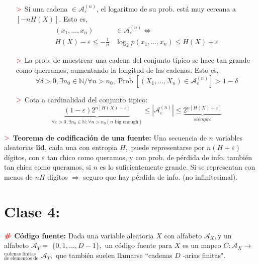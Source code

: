 \documentclass[%
 reprint,
 amsmath,amssymb,
 aps,
]{revtex4-1}
\begin{document}
\begin{enumerate}
  \item[$\textcolor{red}{\mathbf{>}}$] Si una cadena $\in\mathcal{A}_{\varepsilon}^{(n)}$, el logaritmo de su prob. está muy cercana a $[-n H(X)]$. Esto es, 
  $$
  \begin{aligned}
    \left(x_{1}, \ldots, x_{n}\right) & \in \mathcal{A}_{\varepsilon}^{(n)} \Leftrightarrow\\
    H(X)-\varepsilon \leq-\frac{1}{n} & \log _{2} p\left(x_{1}, \ldots, x_{n}\right) \leq H(X)+\varepsilon
  \end{aligned}$$
  
  \item[$\textcolor{red}{\mathbf{>}}$] La prob. de muestrear una cadena del conjunto típico se hace tan grande como querramos,
  aumentando la longitud de las cadenas. Esto es,
  $$
  \forall \delta>0, \exists n_{0} \in \mathbb{N} / \forall n>n_{0}, \operatorname{Prob}\left[\left(X_{1}, \ldots, X_{n}\right) \in \mathcal{A}_{e}^{(n)}\right]>1-\delta
  $$
  \item[$\textcolor{red}{\mathbf{>}}$] Cota a cardinalidad del conjunto tipico:
  $$
  \underbrace{(1-\varepsilon) 2^{n[H(X)-\varepsilon]}}_{\forall \varepsilon>0, \exists n_{0} \in \mathbb{N} : \forall n>n_{0}(n \text{ big enough})}
  \leq
  \left|\mathcal{A}_{\varepsilon}^{(n)}\right| 
  \leq 
  \underbrace{2^{n[H(X)+\varepsilon]}}_{siempre}
  $$
\end{enumerate}

\textbf{$\textcolor{red}{\mathbf{>}}$ Teorema de codificación de una fuente:}
Una secuencia de $n$ variables aleatorias \textbf{iid}, cada una con entropia $H,$ puede representarse por $n(H+\varepsilon)$
dígitos, con $\varepsilon$ tan chico como queramos, y con prob. de pérdida de info. también tan chica
como queramos, si $n$ es lo suficientemente grande. Si se representan con menos de $n H$ dígitos $\Rightarrow$
seguro que hay pérdida de info. (no infinitesimal).

\section{Clase 4:}

\textbf{$\color{red}{\textbf{\#}}$ Código fuente:} 
Dada una variable aleatoria $X$ con alfabeto $\mathcal{A}_{X}, \mathrm{y}$ un alfabeto $\mathcal{A}_{Y}=$
$\{0,1, \ldots, D-1\},$ un código fuente para $X$ es un mapeo $C: \mathcal{A}_{X} \rightarrow$ $^\text{cadenas finitas}
_\text{de elementos de}$
$\mathcal{A}_{Y},$ que también suelen llamarse ``cadenas $D$ -arias finitas".
\end{document}
